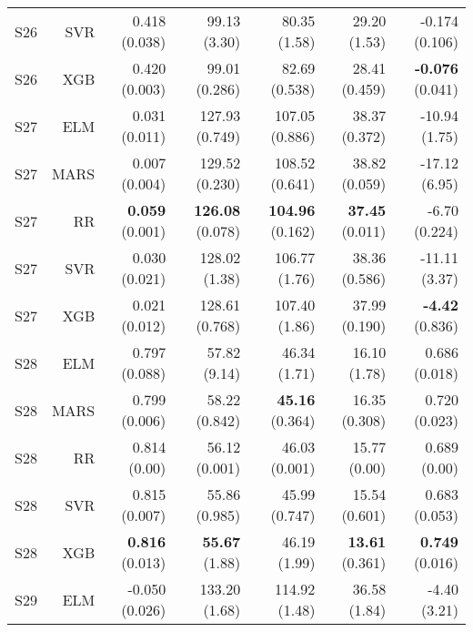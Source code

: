 \begin{table}
\begin{tabular}{rrrrrrr}
    S26 &       SVR &                       0.418 (0.038) &              99.13 (3.30) &            80.35 (1.58) &            29.20 (1.53) &        -0.174 (0.106) \\
    S26 &       XGB &                       0.420 (0.003) &             99.01 (0.286) &           82.69 (0.538) &           28.41 (0.459) & { \bf -0.076} (0.041) \\
    S27 &       ELM &                       0.031 (0.011) &            127.93 (0.749) &          107.05 (0.886) &           38.37 (0.372) &         -10.94 (1.75) \\
    S27 &      MARS &                       0.007 (0.004) &            129.52 (0.230) &          108.52 (0.641) &           38.82 (0.059) &         -17.12 (6.95) \\
    S27 &        RR &                { \bf 0.059} (0.001) &     { \bf 126.08} (0.078) &   { \bf 104.96} (0.162) &    { \bf 37.45} (0.011) &         -6.70 (0.224) \\
    S27 &       SVR &                       0.030 (0.021) &             128.02 (1.38) &           106.77 (1.76) &           38.36 (0.586) &         -11.11 (3.37) \\
    S27 &       XGB &                       0.021 (0.012) &            128.61 (0.768) &           107.40 (1.86) &           37.99 (0.190) &  { \bf -4.42} (0.836) \\
    S28 &       ELM &                       0.797 (0.088) &              57.82 (9.14) &            46.34 (1.71) &            16.10 (1.78) &         0.686 (0.018) \\
    S28 &      MARS &                       0.799 (0.006) &             58.22 (0.842) &    { \bf 45.16} (0.364) &           16.35 (0.308) &         0.720 (0.023) \\
    S28 &        RR &                        0.814 (0.00) &             56.12 (0.001) &           46.03 (0.001) &            15.77 (0.00) &          0.689 (0.00) \\
    S28 &       SVR &                       0.815 (0.007) &             55.86 (0.985) &           45.99 (0.747) &           15.54 (0.601) &         0.683 (0.053) \\
    S28 &       XGB &                { \bf 0.816} (0.013) &       { \bf 55.67} (1.88) &            46.19 (1.99) &    { \bf 13.61} (0.361) &  { \bf 0.749} (0.016) \\
    S29 &       ELM &                      -0.050 (0.026) &             133.20 (1.68) &           114.92 (1.48) &            36.58 (1.84) &          -4.40 (3.21) \\

\end{tabular}
\end{table}
